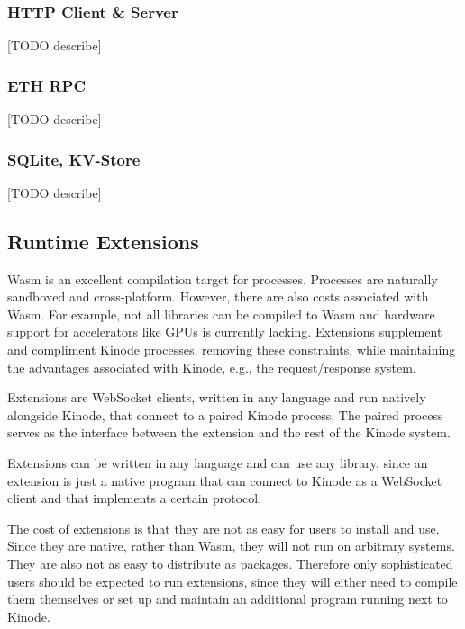 \documentclass[runningheads]{llncs}
\begin{document}
\subsubsection{HTTP Client \& Server}
\label{sec:oshttp}

[TODO describe]

\subsubsection{ETH RPC}
\label{sec:oseth}

[TODO describe]

\subsubsection{SQLite, KV-Store}
\label{sec:osdbs}

[TODO describe]

\subsection{Runtime Extensions}
\label{sec:osextensions}

Wasm is an excellent compilation target for processes.
Processes are naturally sandboxed and cross-platform.
However, there are also costs associated with Wasm.
For example, not all libraries can be compiled to Wasm and hardware support for accelerators like GPUs is currently lacking.
Extensions supplement and compliment Kinode processes, removing these constraints, while maintaining the advantages associated with Kinode, e.g., the request/response system.

Extensions are WebSocket clients, written in any language and run natively alongside Kinode, that connect to a paired Kinode process.
The paired process serves as the interface between the extension and the rest of the Kinode system.

Extensions can be written in any language and can use any library, since an extension is just a native program that can connect to Kinode as a WebSocket client and that implements a certain protocol.

The cost of extensions is that they are not as easy for users to install and use.
Since they are native, rather than Wasm, they will not run on arbitrary systems.
They are also not as easy to distribute as packages.
Therefore only sophisticated users should be expected to run extensions, since they will either need to compile them themselves or set up and maintain an additional program running next to Kinode.
\end{document}
